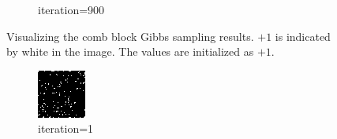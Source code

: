 \documentclass{article}
\begin{document}
\begin{figure}[h]
\begin{subfigure}[t]{0.18\textwidth}
\vspace{-0.6cm}
\caption{iteration=900}
\end{subfigure}\hspace{0.01\textwidth}
\caption{Visualizing the comb block Gibbs sampling results. $+1$ is indicated by white in the image. The values are initialized as $+1$.}
\label{f:63c}
\end{figure}
%
\begin{figure}[h]
\captionsetup[subfigure]{labelformat=empty}
\centering
\begin{subfigure}[t]{0.18\textwidth}
\centering
\includegraphics[width=\textwidth]{./computational/results/gibbs_comb_sampler_negative_iter_0.png}
\vspace{-0.6cm}
\caption{iteration=1}
\end{subfigure}\hspace{0.01\textwidth}
\begin{subfigure}[t]{0.18\textwidth}
\centering

\end{subfigure}
\end{figure}
\end{document}
